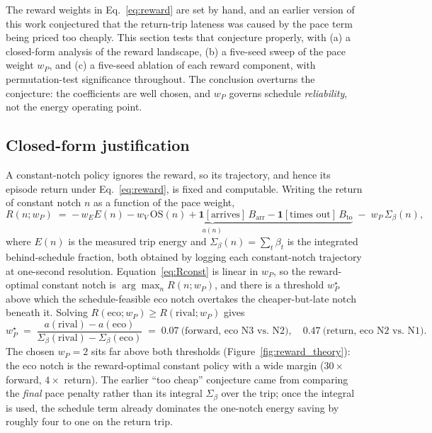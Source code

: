 \documentclass[11pt,a4paper]{article}
\begin{document}
The reward weights in Eq.~\eqref{eq:reward} are set by hand, and an earlier
version of this work conjectured that the return-trip lateness was caused by
the pace term being priced too cheaply. This section tests that conjecture
properly, with (a) a closed-form analysis of the reward landscape, (b) a
five-seed sweep of the pace weight $w_P$, and (c) a five-seed ablation of
each reward component, with permutation-test significance throughout. The
conclusion overturns the conjecture: the coefficients are well chosen, and
$w_P$ governs schedule \emph{reliability}, not the energy operating point.

\subsection{Closed-form justification}
\label{sec:reward-theory}

A constant-notch policy ignores the reward, so its trajectory, and hence its
episode return under Eq.~\eqref{eq:reward}, is fixed and computable. Writing
the return of constant notch $n$ as a function of the pace weight,
\begin{equation}
R(n; w_P) \;=\; \underbrace{-\,w_E E(n) - w_V\,\mathrm{OS}(n) + \mathbf{1}[\text{arrives}]\,B_{\mathrm{arr}} - \mathbf{1}[\text{times out}]\,B_{\mathrm{to}}}_{a(n)} \;-\; w_P \,\Sigma_\beta(n),
\label{eq:Rconst}
\end{equation}
where $E(n)$ is the measured trip energy and
$\Sigma_\beta(n)=\sum_t \beta_t$ is the integrated behind-schedule fraction,
both obtained by logging each constant-notch trajectory at one-second
resolution. Equation~\eqref{eq:Rconst} is linear in $w_P$, so the
reward-optimal constant notch is $\arg\max_n R(n;w_P)$, and there is a
threshold $w_P^\star$ above which the schedule-feasible eco notch overtakes
the cheaper-but-late notch beneath it. Solving
$R(\text{eco};w_P)\ge R(\text{rival};w_P)$ gives
\begin{equation}
w_P^\star \;=\; \frac{a(\text{rival}) - a(\text{eco})}{\Sigma_\beta(\text{rival}) - \Sigma_\beta(\text{eco})}
\;=\; 0.07 \ \text{(forward, eco N3 vs.\ N2)}, \quad 0.47 \ \text{(return, eco N2 vs.\ N1)}.
\end{equation}
The chosen $w_P=2$ sits far above both thresholds
(Figure~\ref{fig:reward_theory}): the eco notch is the reward-optimal
constant policy with a wide margin ($30\times$ forward, $4\times$ return).
The earlier ``too cheap'' conjecture came from comparing the \emph{final}
pace penalty rather than its integral $\Sigma_\beta$ over the trip; once the
integral is used, the schedule term already dominates the one-notch energy
saving by roughly four to one on the return trip.
\end{document}
